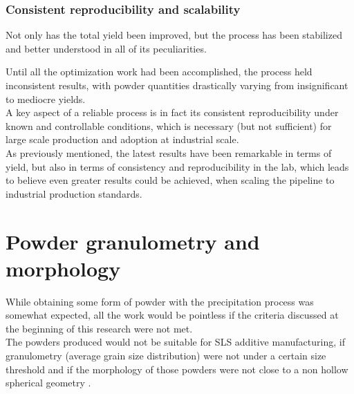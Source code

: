 \documentclass[a4paper]{article}
\begin{document}
%
%

        \subsubsection{Consistent reproducibility and scalability\label{consistent_reproducibility}}

        Not only has the total yield been improved, but the process has been stabilized and better understood in all of its 
        peculiarities. 

        Until all the optimization work had been accomplished, the process held inconsistent results, with powder quantities drastically 
        varying from insignificant to mediocre yields. \\ 

        A key aspect of a reliable process is in fact its consistent reproducibility under known and controllable conditions, 
        which is necessary (but not sufficient) for large scale production and adoption at industrial scale. \\ 

        As previously mentioned, the latest results have been remarkable in terms of yield, but also in terms of consistency and
        reproducibility in the lab, which leads to believe even greater results could be 
        achieved, when scaling the pipeline to industrial production standards. \\ 




    \clearpage
    \section{Powder granulometry and morphology\label{powder_granulometry_morphology}} 

    While obtaining some form of powder with the precipitation process was somewhat expected, all the work would be 
    pointless if the criteria discussed at the beginning of this research were not met. \\ 

    The powders produced would not be suitable for SLS additive manufacturing, if granulometry (average grain size distribution)
    were not under a certain size threshold and if the morphology of those powders were not close to a non hollow spherical geometry 
    \autocites{Padovano_SLS_Review}. \\
\end{document}
